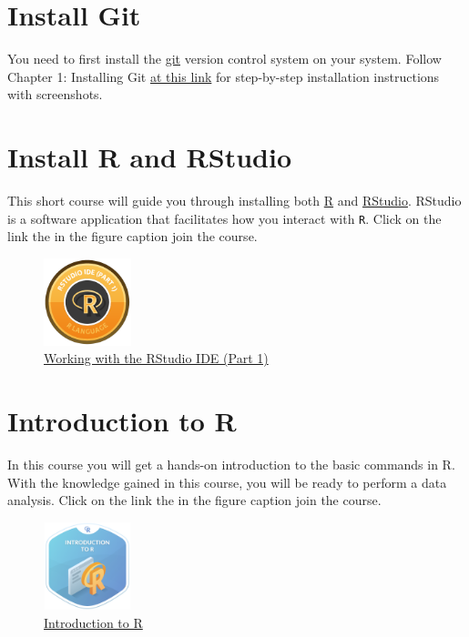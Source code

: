 \documentclass[letterpaper,9pt,twocolumn,twoside,printwatermark=false]{pinp}
\begin{document}
\section{Install Git}\label{install-git}

You need to first install the \href{https://git-scm.com/}{git} version
control system on your system. Follow Chapter 1: Installing Git
\href{https://plot.ly/r/github-getting-started-for-data-scientists/\#chapter-1-installing-git}{at
this link} for step-by-step installation instructions with screenshots.

\section{Install R and RStudio}\label{install-r-and-rstudio}

This short course will guide you through installing both
\href{https://cran.r-project.org/}{R} and
\href{https://www.rstudio.com/products/rstudio/download/preview/}{RStudio}.
RStudio is a software application that facilitates how you interact with
\texttt{R}. Click on the link the in the figure caption join the course.

\begin{figure}[H]
  \begin{center}
    \includegraphics[width=1in, height=1in]{../../images/rstudio_ide.png} 
  \end{center}
  \caption{\href{https://www.datacamp.com/courses/working-with-the-rstudio-ide-part-1}{Working with the RStudio IDE (Part 1)}}\label{fig}
\end{figure}

\section{Introduction to R}\label{introduction-to-r}

In this course you will get a hands-on introduction to the basic
commands in R. With the knowledge gained in this course, you will be
ready to perform a data analysis. Click on the link the in the figure
caption join the course.

\begin{figure}[H]
  \begin{center}
    \includegraphics[width=1in, height=1in]{../../images/intro_r.png} 
  \end{center}
  \caption{\href{https://www.datacamp.com/courses/free-introduction-to-r}{Introduction to R}}\label{fig}
\end{figure}
\end{document}
